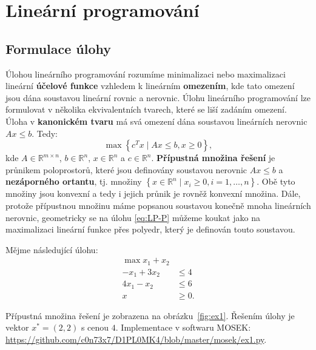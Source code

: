 \chapter{Lineární programování}

\section{Formulace úlohy}

Úlohou lineárního programování rozumíme minimalizaci nebo maximalizaci lineární \textbf{účelové funkce} vzhledem k lineárním \textbf{omezením}, kde tato omezení jsou dána soustavou lineární rovnic a nerovnic. Úlohu lineárního programování lze formulovat v několika ekvivalentních tvarech, které se liší zadáním omezení. Úloha v \textbf{kanonickém tvaru} má svá omezení dána soustavou lineárních nerovnic $Ax \leq b$. Tedy:
\begin{equation}\tag{LP-P}
    \max \left\{ c^T x \mid Ax \leq b, x \geq 0 \right\},
    \label{eq:LP-P}
\end{equation}
kde $A \in \mathbb{R}^{m \times n}$, $b \in \mathbb{R}^n$, $x \in \mathbb{R}^n$ a $c \in \mathbb{R}^n$. \textbf{Přípustná množina řešení} je průnikem poloprostorů, které jsou definovány soustavou nerovnic $Ax \leq b$ a \textbf{nezáporného ortantu}, tj. množiny $\left\{ x \in \mathbb{R}^n \mid x_i \geq 0, i = 1, \dots, n \right\}$. Obě tyto množiny jsou konvexní a tedy i jejich průnik je rovněž konvexní množina. Dále, protože přípustnou množinu máme popsanou soustavou konečně mnoha lineárních nerovnic, geometricky se na úlohu \ref{eq:LP-P} můžeme koukat jako na maximalizaci lineární funkce přes polyedr, který je definován touto soustavou.

\begin{pr}
Mějme následující úlohu:
\begin{equation}\tag{P1}
    \begin{split}
        \max x_1 + x_2 &       \\
        - x_1 + 3 x_2  &\leq 4 \\
        4 x_1 -   x_2  &\leq 6 \\
        x &\geq 0.
    \end{split}
    \label{eq:P1}
\end{equation}

Přípustná množina řešení je zobrazena na obrázku~\ref{fig:ex1}. Řešením úlohy je vektor $x^* = (2, 2)$ s cenou $4$. Implementace v softwaru MOSEK: \url{https://github.com/c0n73x7/D1PL0MK4/blob/master/mosek/ex1.py}.
\end{pr}

